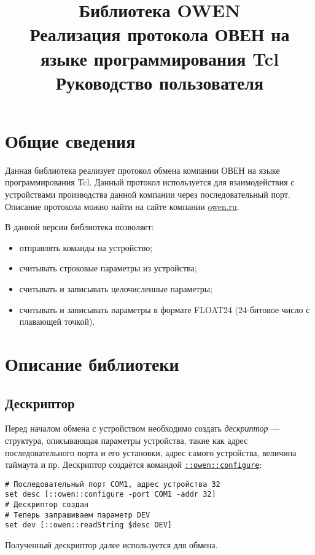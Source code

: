 \documentclass[12pt, a4paper]{article}
\title{Библиотека OWEN \\ Реализация протокола ОВЕН на языке программирования Tcl \\ Руководство пользователя}
\newcommand{\CMD}[1]{{\tt \hyperref[#1]{#1}}}
\begin{document}
\maketitle

\tableofcontents

\section{Общие сведения}

Данная библиотека реализует протокол обмена компании ОВЕН на языке программирования Tcl. Данный протокол используется для взаимодействия с устройствами производства данной компании через последовательный порт. Описание протокола можно найти на сайте компании \href{http://owen.ru}{owen.ru}. 

В данной версии библиотека позволяет:

\begin{itemize}
\item отправлять команды на устройство;
\item считывать строковые параметры из устройства;
\item считывать и записывать целочисленные параметры;
\item считывать и записывать параметры в формате FLOAT24 (24-битовое число с плавающей точкой).
\end{itemize}

\section{Описание библиотеки}

\subsection{Дескриптор}

Перед началом обмена с устройством необходимо создать {\it дескриптор} --- структура, описывающая параметры устройства, такие как адрес последовательного порта и его установки, адрес самого устройства, величина таймаута и пр. Дескриптор создаётся командой \CMD{::owen::configure}:

\begin{verbatim} 
# Последовательный порт COM1, адрес устройства 32
set desc [::owen::configure -port COM1 -addr 32]
# Дескриптор создан
# Теперь запрашиваем параметр DEV
set dev [::owen::readString $desc DEV]
\end{verbatim} 

Полученный дескриптор далее используется для обмена.
\end{document}
